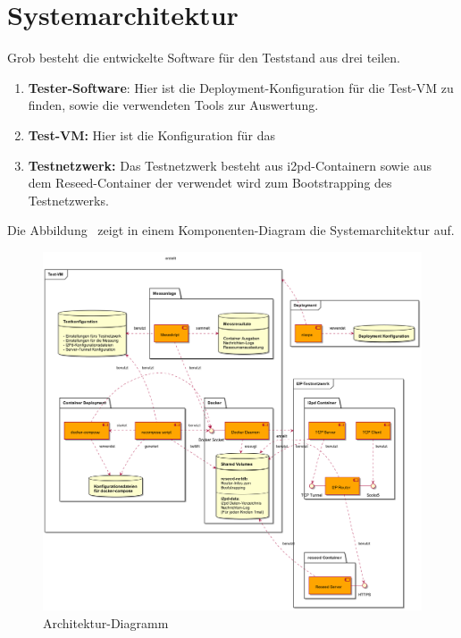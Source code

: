 \newpage

\section{Systemarchitektur}

Grob besteht die entwickelte Software für den Teststand aus drei teilen.

\begin{enumerate}
    \item \textbf{Tester-Software}: Hier ist die Deployment-Konfiguration für die Test-VM zu finden, sowie die verwendeten Tools zur Auswertung.
    \item \textbf{Test-VM:} Hier ist die Konfiguration für das 
    \item \textbf{Testnetzwerk:} Das Testnetzwerk besteht aus i2pd-Containern sowie aus dem Reseed-Container der verwendet wird zum Bootstrapping des Testnetzwerks.
\end{enumerate}

Die Abbildung~ zeigt in einem Komponenten-Diagram die Systemarchitektur auf.


\begin{landscape}%
\begin{figure}[ht]
  \includegraphics[height=0.85\textwidth]{include/uml/componentDiagram.png}
  \caption{Architektur-Diagramm}\label{fig:architektur-diagramm}
\end{figure}
\end{landscape}%



